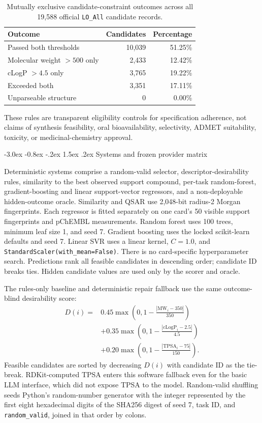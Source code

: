 \documentclass[10pt,a4paper]{article}
\makeatletter
\renewcommand\section{\@startsection{section}{1}{\z@}%
  {-3.0ex \@plus -0.8ex \@minus -.2ex}%
  {1.5ex \@plus .2ex}%
  {\normalfont\Large\bfseries}}
\makeatother
\begin{document}
\begin{table}[h]
\centering
\small
\caption{Mutually exclusive candidate-constraint outcomes across all 19,588
official \texttt{LO\_All} candidate records.}
\label{tab:constraint_accounting}
\begin{tabular}{@{}lrr@{}}
\toprule
\textbf{Outcome} & \textbf{Candidates} & \textbf{Percentage} \\
\midrule
Passed both thresholds & 10,039 & 51.25\% \\
Molecular weight $>500$ only & 2,433 & 12.42\% \\
cLogP $>4.5$ only & 3,765 & 19.22\% \\
Exceeded both & 3,351 & 17.11\% \\
Unparseable structure & 0 & 0.00\% \\
\bottomrule
\end{tabular}
\end{table}

These rules are transparent eligibility controls for specification adherence,
not claims of synthesis feasibility, oral bioavailability, selectivity, ADMET
suitability, toxicity, or medicinal-chemistry approval.

\section{Systems and frozen provider matrix}

Deterministic systems comprise a random-valid selector, descriptor-desirability
rules, similarity to the best observed support compound, per-task random-forest,
gradient-boosting and linear support-vector regressors, and a non-deployable
hidden-outcome oracle. Similarity and QSAR use 2,048-bit radius-2 Morgan
fingerprints. Each regressor is fitted separately on one card's 50 visible
support fingerprints and pChEMBL measurements. Random forest uses 100 trees,
minimum leaf size 1, and seed 7. Gradient boosting uses the locked
scikit-learn defaults and seed 7. Linear SVR uses a linear kernel, $C=1.0$, and
\texttt{StandardScaler(with\_mean=False)}. There is no card-specific
hyperparameter search. Predictions rank all feasible candidates in descending
order; candidate ID breaks ties. Hidden candidate values are used only by the
scorer and oracle.

The rules-only baseline and deterministic repair fallback use the same
outcome-blind desirability score:
{\normalsize
\begin{align*}
D(i)={}&0.45\max\!\left(0,1-\frac{|\mathrm{MW}_i-350|}{350}\right)\\
 &+0.35\max\!\left(0,1-\frac{|\mathrm{cLogP}_i-2.5|}{4.5}\right)\\
 &+0.20\max\!\left(0,1-\frac{|\mathrm{TPSA}_i-75|}{150}\right).
\end{align*}
}
Feasible candidates are sorted by decreasing $D(i)$ with candidate ID as the
tie-break. RDKit-computed TPSA enters this software fallback even for the basic
LLM interface, which did not expose TPSA to the model. Random-valid shuffling
seeds Python's random-number generator with the integer represented by the first
eight hexadecimal digits of the SHA256 digest of seed 7, task ID, and
\texttt{random\_valid}, joined in that order by colons.
\end{document}
